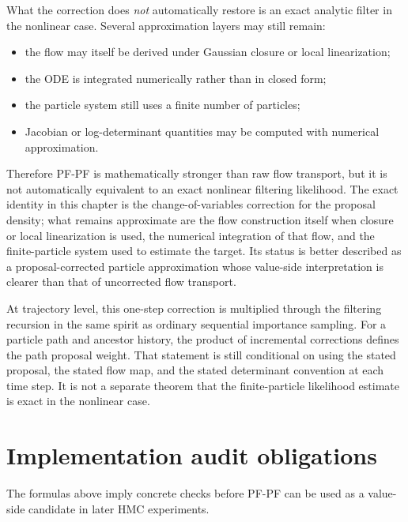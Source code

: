 What the correction does \emph{not} automatically restore is an exact analytic
filter in the nonlinear case.  Several approximation layers may still remain:
\begin{itemize}
  \item the flow may itself be derived under Gaussian closure or local
    linearization;
  \item the ODE is integrated numerically rather than in closed form;
  \item the particle system still uses a finite number of particles;
  \item Jacobian or log-determinant quantities may be computed with numerical
    approximation.
\end{itemize}
Therefore PF-PF is mathematically stronger than raw flow transport, but it is
not automatically equivalent to an exact nonlinear filtering likelihood.  The
exact identity in this chapter is the change-of-variables correction for the
proposal density; what remains approximate are the flow construction itself when
closure or local linearization is used, the numerical integration of that flow,
and the finite-particle system used to estimate the target.  Its status is
better described as a proposal-corrected particle approximation whose value-side
interpretation is clearer than that of uncorrected flow transport.

At trajectory level, this one-step correction is multiplied through the
filtering recursion in the same spirit as ordinary sequential importance
sampling.  For a particle path and ancestor history, the product of incremental
corrections defines the path proposal weight.  That statement is still
conditional on using the stated proposal, the stated flow map, and the stated
determinant convention at each time step.  It is not a separate theorem that the
finite-particle likelihood estimate is exact in the nonlinear case.

\section{Implementation audit obligations}
\label{sec:bf-pfpf-audit-obligations}

The formulas above imply concrete checks before PF-PF can be used as a
value-side candidate in later HMC experiments.

